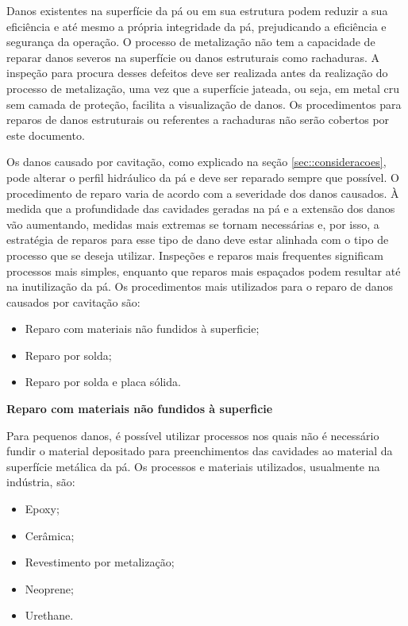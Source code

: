 Danos existentes na superfície da pá ou em sua estrutura podem reduzir a sua
eficiência e até mesmo a própria integridade da pá, prejudicando a eficiência e
segurança da operação. O processo de metalização não tem a capacidade de reparar
danos severos na superfície ou danos estruturais como rachaduras. A inspeção
para procura desses defeitos deve ser realizada antes da realização do processo
de metalização, uma vez que a superfície jateada, ou seja, em metal cru sem
camada de proteção, facilita a visualização de danos. Os procedimentos para
reparos de danos estruturais ou referentes a rachaduras não serão cobertos por
este documento.

Os danos causado por cavitação, como explicado na seção
\ref{sec::consideracoes}, pode alterar o perfil hidráulico da pá e deve ser
reparado sempre que possível. O procedimento de reparo varia de acordo com a
severidade dos danos causados. À medida que a profundidade das cavidades geradas
na pá e a extensão dos danos vão aumentando, medidas mais extremas se tornam
necessárias e, por isso, a estratégia de reparos para esse tipo de dano deve
estar alinhada com o tipo de processo que se deseja utilizar. Inspeções e
reparos mais frequentes significam processos mais simples, enquanto que reparos
mais espaçados podem resultar até na inutilização da pá. Os procedimentos mais
utilizados para o reparo de danos causados por cavitação são:

\begin{itemize}
  \item Reparo com materiais não fundidos à superficie;
  \item Reparo por solda;
  \item Reparo por solda e placa sólida.
\end{itemize}

\textbf{Reparo com materiais não fundidos à superficie}

Para pequenos danos, é possível utilizar processos nos quais não é necessário
fundir o material depositado para preenchimentos das cavidades ao material da
superfície metálica da pá. Os processos e materiais utilizados, usualmente na
indústria, são: 

\begin{itemize}
\item Epoxy;
\item Cerâmica;
\item Revestimento por metalização;
\item Neoprene;
\item Urethane.
\end{itemize}

